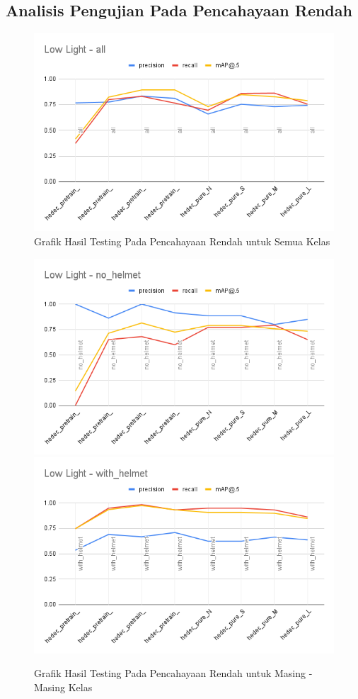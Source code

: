 \begin{enumerate}
  \subsection{Analisis Pengujian Pada Pencahayaan Rendah}
  \label{subsec:analisis_lowlight}

  \begin{figure}[ht]
    \centering
    \includegraphics[width=1.0\textwidth]{gambar/lowlight_grafic/Low Light - all.png}
    \caption{Grafik Hasil Testing Pada Pencahayaan Rendah untuk Semua Kelas}
    \label{fig:graf_lowlight_all}  
  \end{figure}

  \begin{figure}[ht]
    \centering
    \includegraphics[width=.45\textwidth]{gambar/lowlight_grafic/Low Light - no_helmet.png}
    \includegraphics[width=.45\textwidth]{gambar/lowlight_grafic/Low Light - with_helmet.png}
    \caption{Grafik Hasil Testing Pada Pencahayaan Rendah untuk Masing - Masing Kelas}
    \label{fig:graf_lowlight_eachclass}  
  \end{figure}


\end{enumerate}
